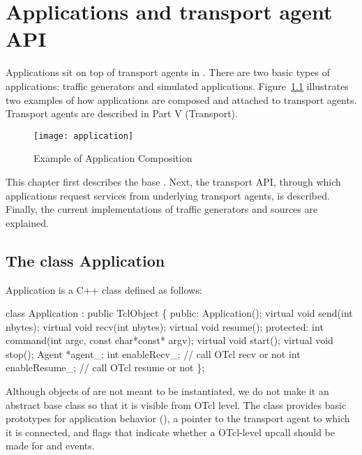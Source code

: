 \chapter{Applications and transport agent API}
\label{chap:applications}

Applications sit on top of transport agents in \ns.  There are two basic types
of applications:  traffic generators and simulated applications.  
Figure~\ref{fig:application} illustrates two examples of how applications
are composed and attached to transport agents.  Transport agents are described
in Part V (Transport).

\begin{figure}[tb] 
  \centerline{\texttt{[image: application]}}
  \caption{Example of Application Composition}
  \label{fig:application} 
\end{figure}

This chapter first describes the base . 
Next, the transport API, through which applications request services from
underlying transport agents, is described.  Finally, the current 
implementations of traffic generators and sources are explained.  


\section{The class Application}
\label{sec:appclass}

Application is a C++ class defined as follows:
\begin{program}
        class Application : public TclObject \{
        public:
                Application();
                virtual void send(int nbytes);
                virtual void recv(int nbytes);
                virtual void resume();
        protected:
                int command(int argc, const char*const* argv);
                virtual void start();
                virtual void stop();
                Agent *agent_;
                int enableRecv_;                // call OTcl recv or not
                int enableResume_;              // call OTcl resume or not
        \};
\end{program}
Although objects of  are not meant to be instantiated,
we do not make it an abstract base class so that it is visible from OTcl level.
The class provides basic prototypes for application behavior 
(), a pointer to the 
transport agent to which it is connected, and flags that indicate whether
a OTcl-level upcall should be made for  and 
 events.  

